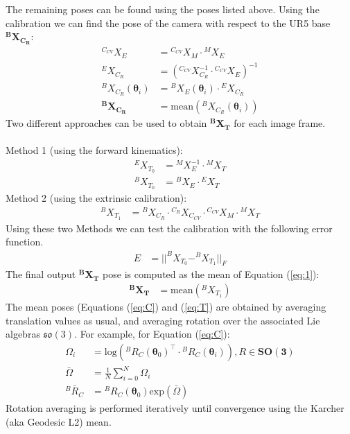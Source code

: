 \documentclass[10pt,a4paper]{article}
\begin{document}
\noindent The remaining poses can be found using the poses listed above. Using the calibration we can find the pose of the camera with respect to the UR5 base $\bm{^BX_{C_R}}$:
\begin{align}
^{C_{CV}}X_E &= \mbox{}^{C_{CV}}X_M\cdot\mbox{}^MX_E\nonumber\\
^EX_{C_R} &= (^{C_{CV}}X_{C_R}^{-1}\cdot\mbox{}^{C_{CV}}X_E)^{-1}\nonumber\\
^BX_{C_R}(\bm{\theta}_i) &= \mbox{}^BX_E(\bm{\theta}_i)\cdot\mbox{}^EX_{C_R}\nonumber\\
\bm{^BX_{C_R}} &= \text{mean}(^BX_{C_R}(\bm{\theta}_i)) \label{eq:C}
\end{align}
Two different approaches can be used to obtain $\bm{^BX_{T}}$ for each image frame. \\
\\
Method 1 (using the forward kinematics):
\begin{align}
^EX_{T_0} &= \mbox{}^MX_E^{-1}\cdot\mbox{}^MX_T \nonumber \\
^BX_{T_0} &=\mbox{}^BX_E\cdot\mbox{}^EX_T \label{eq:1}
\end{align}
Method 2 (using the extrinsic calibration):
\begin{align}
^BX_{T_1} &= \mbox{}^BX_{C_R}\cdot\mbox{}^{C_{R}}X_{C_{CV}}\cdot\mbox{}^{C_{CV}}X_M\cdot\mbox{}^MX_T\label{eq:2}
\end{align}
Using these two Methods we can test the calibration with the following error function.
\begin{align}
E &=||^BX_{T_0} - ^BX_{T_1}||_F
\end{align} 
The final output $\bm{^BX_{T}}$ pose is computed as the mean of Equation (\ref{eq:1}):
\begin{align}
\bm{^BX_{T}} &= \text{mean}(^BX_{T_1})  \label{eq:T}
\end{align} 
The mean poses (Equations (\ref{eq:C}) and (\ref{eq:T}) are obtained by averaging translation values as usual, and averaging rotation over the associated Lie algebras $\mathfrak{so(3)}$. For example, for Equation (\ref{eq:C}):
\begin{align*}
\Omega_i &= \text{log}(^BR_{C}(\bm{\theta}_0)^\top\cdot\mbox{}^BR_{C}(\bm{\theta}_i)), R\in\mathbf{SO(3)}\\
\bar{\Omega} &= \frac{1}{N}\sum_{i=0}^N\Omega_i\\
^B\bar{R}_{C} &=\mbox{} ^BR_{C}(\bm{\theta}_0)\text{exp}(\bar{\Omega})
\end{align*}
Rotation averaging is performed iteratively until convergence using the Karcher (aka Geodesic L2) mean.\\
\end{document}
